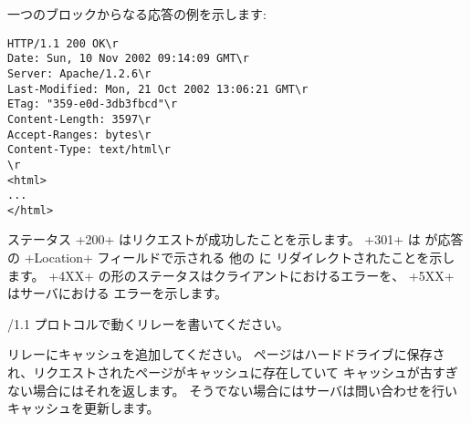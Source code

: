%
一つのブロックからなる応答の例を示します:
\begin{lstlisting}
HTTP/1.1 200 OK\r
Date: Sun, 10 Nov 2002 09:14:09 GMT\r
Server: Apache/1.2.6\r
Last-Modified: Mon, 21 Oct 2002 13:06:21 GMT\r
ETag: "359-e0d-3db3fbcd"\r
Content-Length: 3597\r
Accept-Ranges: bytes\r
Content-Type: text/html\r
\r
<html>
...
</html>
\end{lstlisting}
ステータス \ml+200+ はリクエストが成功したことを示します。
\ml+301+ は \URL が応答の \ml+Location+ フィールドで示される 他の \URL に
リダイレクトされたことを示します。
\ml+4XX+ の形のステータスはクライアントにおけるエラーを、 \ml+5XX+ はサーバにおける
エラーを示します。

\begin{exercise}[noanswer]
\label{ex/proxy-1.1}
\http/1.1 プロトコルで動くリレーを書いてください。
\end{exercise}

\begin{exercise}[noanswer]
リレーにキャッシュを追加してください。
ページはハードドライブに保存され、リクエストされたページがキャッシュに存在していて
キャッシュが古すぎない場合にはそれを返します。
そうでない場合にはサーバは問い合わせを行いキャッシュを更新します。
\end{exercise}

